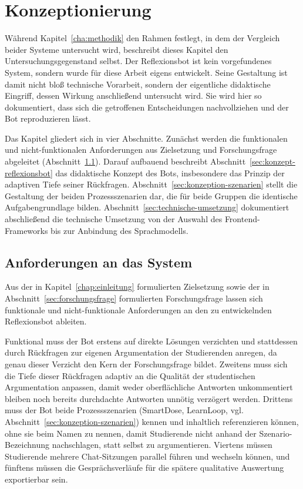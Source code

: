 \chapter{Konzeptionierung}
\label{cha:concept}

Während Kapitel~\ref{cha:methodik} den Rahmen festlegt, in dem der Vergleich beider Systeme
untersucht wird, beschreibt dieses Kapitel den Untersuchungsgegenstand selbst. Der Reflexionsbot ist
kein vorgefundenes System, sondern wurde für diese Arbeit eigens entwickelt. Seine Gestaltung ist
damit nicht bloß technische Vorarbeit, sondern der eigentliche didaktische Eingriff, dessen Wirkung
anschließend untersucht wird. Sie wird hier so dokumentiert, dass sich die getroffenen
Entscheidungen nachvollziehen und der Bot reproduzieren lässt.

Das Kapitel gliedert sich in vier Abschnitte. Zunächst werden die funktionalen und
nicht-funktionalen Anforderungen aus Zielsetzung und Forschungsfrage abgeleitet
(Abschnitt~\ref{sec:anforderungen}). Darauf aufbauend beschreibt
Abschnitt~\ref{sec:konzept-reflexionsbot} das didaktische Konzept des Bots, insbesondere das Prinzip
der adaptiven Tiefe seiner Rückfragen. Abschnitt~\ref{sec:konzeption-szenarien} stellt die Gestaltung
der beiden Prozessszenarien dar, die für beide Gruppen die identische Aufgabengrundlage bilden.
Abschnitt~\ref{sec:technische-umsetzung} dokumentiert abschließend die technische Umsetzung von der
Auswahl des Frontend-Frameworks bis zur Anbindung des Sprachmodells.

\section{Anforderungen an das System}
\label{sec:anforderungen}

Aus der in Kapitel~\ref{chap:einleitung} formulierten Zielsetzung sowie der in
Abschnitt~\ref{sec:forschungsfrage} formulierten Forschungsfrage lassen sich funktionale und
nicht-funktionale Anforderungen an den zu entwickelnden Reflexionsbot ableiten.

Funktional muss der Bot erstens auf direkte Lösungen verzichten und stattdessen durch Rückfragen
zur eigenen Argumentation der Studierenden anregen, da genau dieser Verzicht den Kern der
Forschungsfrage bildet. Zweitens muss sich die Tiefe dieser Rückfragen adaptiv an die Qualität der
studentischen Argumentation anpassen, damit weder oberflächliche Antworten unkommentiert bleiben
noch bereits durchdachte Antworten unnötig verzögert werden. Drittens muss der Bot beide
Prozessszenarien (SmartDose, LearnLoop, vgl. Abschnitt~\ref{sec:konzeption-szenarien}) kennen und
inhaltlich referenzieren können, ohne sie beim Namen zu nennen, damit Studierende nicht anhand der
Szenario-Bezeichnung nachschlagen, statt selbst zu argumentieren. Viertens müssen Studierende
mehrere Chat-Sitzungen parallel führen und wechseln können, und fünftens müssen die
Gesprächsverläufe für die spätere qualitative Auswertung exportierbar sein.

